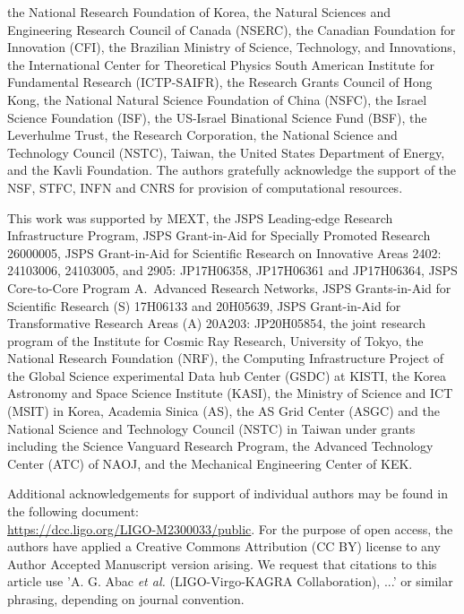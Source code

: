 the National Research Foundation of Korea,
the Natural Sciences and Engineering Research Council of Canada (NSERC),
the Canadian Foundation for Innovation (CFI),
the Brazilian Ministry of Science, Technology, and Innovations,
the International Center for Theoretical Physics South American Institute for Fundamental Research (ICTP-SAIFR), 
the Research Grants Council of Hong Kong,
the National Natural Science Foundation of China (NSFC),
the Israel Science Foundation (ISF),
the US-Israel Binational Science Fund (BSF),
the Leverhulme Trust, 
the Research Corporation,
the National Science and Technology Council (NSTC), Taiwan,
the United States Department of Energy,
and
the Kavli Foundation.
The authors gratefully acknowledge the support of the NSF, STFC, INFN and CNRS for provision of computational resources.

This work was supported by MEXT,
the JSPS Leading-edge Research Infrastructure Program,
JSPS Grant-in-Aid for Specially Promoted Research 26000005,
JSPS Grant-in-Aid for Scientific Research on Innovative Areas 2402: 24103006,
24103005, and 2905: JP17H06358, JP17H06361 and JP17H06364,
JSPS Core-to-Core Program A.\ Advanced Research Networks,
JSPS Grants-in-Aid for Scientific Research (S) 17H06133 and 20H05639,
JSPS Grant-in-Aid for Transformative Research Areas (A) 20A203: JP20H05854,
the joint research program of the Institute for Cosmic Ray Research,
University of Tokyo,
the National Research Foundation (NRF),
the Computing Infrastructure Project of the Global Science experimental Data hub
Center (GSDC) at KISTI,
the Korea Astronomy and Space Science Institute (KASI),
the Ministry of Science and ICT (MSIT) in Korea,
Academia Sinica (AS),
the AS Grid Center (ASGC) and the National Science and Technology Council (NSTC)
in Taiwan under grants including the Science Vanguard Research Program,
the Advanced Technology Center (ATC) of NAOJ,
and the Mechanical Engineering Center of KEK.

Additional acknowledgements for support of individual authors may be found in the following document: \\
\url{https://dcc.ligo.org/LIGO-M2300033/public}.
For the purpose of open access, the authors have applied a Creative Commons Attribution (CC BY)
license to any Author Accepted Manuscript version arising.
We request that citations to this article use 'A. G. Abac {\it et al.} (LIGO-Virgo-KAGRA Collaboration), ...' or similar phrasing, depending on journal convention.

